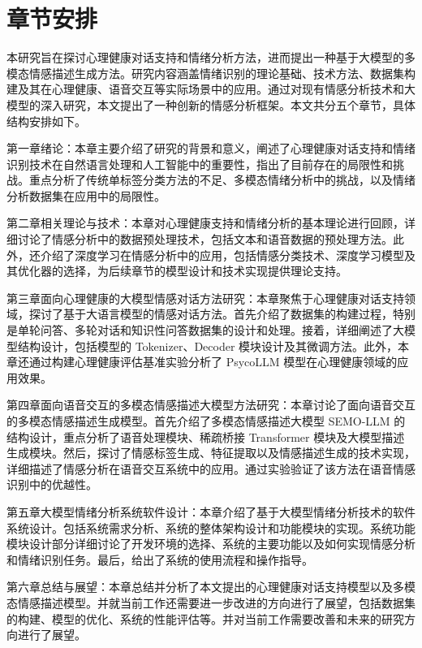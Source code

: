 \section{章节安排}

本研究旨在探讨心理健康对话支持和情绪分析方法，进而提出一种基于大模型的多模态情感描述生成方法。研究内容涵盖情绪识别的理论基础、技术方法、数据集构建及其在心理健康、语音交互等实际场景中的应用。通过对现有情感分析技术和大模型的深入研究，本文提出了一种创新的情感分析框架。本文共分五个章节，具体结构安排如下。

第一章绪论：本章主要介绍了研究的背景和意义，阐述了心理健康对话支持和情绪识别技术在自然语言处理和人工智能中的重要性，指出了目前存在的局限性和挑战。重点分析了传统单标签分类方法的不足、多模态情绪分析中的挑战，以及情绪分析数据集在应用中的局限性。

第二章相关理论与技术：本章对心理健康支持和情绪分析的基本理论进行回顾，详细讨论了情感分析中的数据预处理技术，包括文本和语音数据的预处理方法。此外，还介绍了深度学习在情感分析中的应用，包括情感分类技术、深度学习模型及其优化器的选择，为后续章节的模型设计和技术实现提供理论支持。

第三章面向心理健康的大模型情感对话方法研究：本章聚焦于心理健康对话支持领域，探讨了基于大语言模型的情感对话方法。首先介绍了数据集的构建过程，特别是单轮问答、多轮对话和知识性问答数据集的设计和处理。接着，详细阐述了大模型结构设计，包括模型的 Tokenizer、Decoder 模块设计及其微调方法。此外，本章还通过构建心理健康评估基准实验分析了 PsycoLLM 模型在心理健康领域的应用效果。

第四章面向语音交互的多模态情感描述大模型方法研究：本章讨论了面向语音交互的多模态情感描述生成模型。首先介绍了多模态情感描述大模型 SEMO-LLM 的结构设计，重点分析了语音处理模块、稀疏桥接 Transformer 模块及大模型描述生成模块。然后，探讨了情感标签生成、特征提取以及情感描述生成的技术实现，详细描述了情感分析在语音交互系统中的应用。通过实验验证了该方法在语音情感识别中的优越性。

第五章大模型情绪分析系统软件设计：本章介绍了基于大模型情绪分析技术的软件系统设计。包括系统需求分析、系统的整体架构设计和功能模块的实现。系统功能模块设计部分详细讨论了开发环境的选择、系统的主要功能以及如何实现情感分析和情绪识别任务。最后，给出了系统的使用流程和操作指导。

第六章总结与展望：本章总结并分析了本文提出的心理健康对话支持模型以及多模态情感描述模型。并就当前工作还需要进一步改进的方向进行了展望，包括数据集的构建、模型的优化、系统的性能评估等。并对当前工作需要改善和未来的研究方向进行了展望。